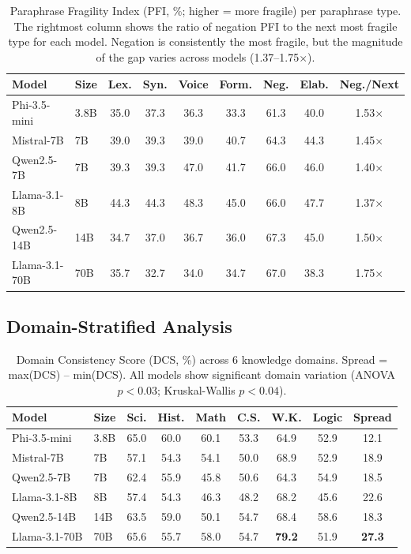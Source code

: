 \documentclass{article}
\begin{document}
\begin{table}[t]
\caption{Paraphrase Fragility Index (PFI, \%; higher = more fragile) per paraphrase type. The rightmost column shows the ratio of negation PFI to the next most fragile type for each model. Negation is consistently the most fragile, but the magnitude of the gap varies across models (1.37--1.75$\times$).}
\label{tab:pfi}
\centering
\small
\begin{tabular}{llccccccc}
\toprule
Model & Size & Lex. & Syn. & Voice & Form. & Neg. & Elab. & Neg./Next \\
\midrule
Phi-3.5-mini & 3.8B & 35.0 & 37.3 & 36.3 & 33.3 & 61.3 & 40.0 & 1.53$\times$ \\
Mistral-7B & 7B & 39.0 & 39.3 & 39.0 & 40.7 & 64.3 & 44.3 & 1.45$\times$ \\
Qwen2.5-7B & 7B & 39.3 & 39.3 & 47.0 & 41.7 & 66.0 & 46.0 & 1.40$\times$ \\
Llama-3.1-8B & 8B & 44.3 & 44.3 & 48.3 & 45.0 & 66.0 & 47.7 & 1.37$\times$ \\
Qwen2.5-14B & 14B & 34.7 & 37.0 & 36.7 & 36.0 & 67.3 & 45.0 & 1.50$\times$ \\
Llama-3.1-70B & 70B & 35.7 & 32.7 & 34.0 & 34.7 & 67.0 & 38.3 & 1.75$\times$ \\
\bottomrule
\end{tabular}
\end{table}

\subsection{Domain-Stratified Analysis}

\begin{table}[t]
\caption{Domain Consistency Score (DCS, \%) across 6 knowledge domains. Spread = max(DCS) -- min(DCS). All models show significant domain variation (ANOVA $p < 0.03$; Kruskal-Wallis $p < 0.04$).}
\label{tab:domain}
\centering
\small
\begin{tabular}{llccccccc}
\toprule
Model & Size & Sci. & Hist. & Math & C.S. & W.K. & Logic & Spread \\
\midrule
Phi-3.5-mini & 3.8B & 65.0 & 60.0 & 60.1 & 53.3 & 64.9 & 52.9 & 12.1 \\
Mistral-7B & 7B & 57.1 & 54.3 & 54.1 & 50.0 & 68.9 & 52.9 & 18.9 \\
Qwen2.5-7B & 7B & 62.4 & 55.9 & 45.8 & 50.6 & 64.3 & 54.9 & 18.5 \\
Llama-3.1-8B & 8B & 57.4 & 54.3 & 46.3 & 48.2 & 68.2 & 45.6 & 22.6 \\
Qwen2.5-14B & 14B & 63.5 & 59.0 & 50.1 & 54.7 & 68.4 & 58.6 & 18.3 \\
Llama-3.1-70B & 70B & 65.6 & 55.7 & 58.0 & 54.7 & \textbf{79.2} & 51.9 & \textbf{27.3} \\
\bottomrule
\end{tabular}
\end{table}
\end{document}
